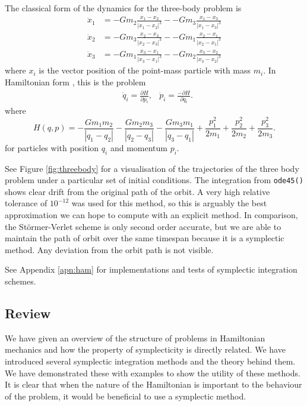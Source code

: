 The classical form of the dynamics for the three-body problem is
\begin{equation*}
	\begin{aligned}
		\ddot{x}_1 &= -G m_2 \frac{x_1 - x_2}{|x_1 - x_2|^3} - -G m_3 \frac{x_1 - x_3}{|x_1 - x_3|^3} \\
		\ddot{x}_2 &= -G m_3 \frac{x_2 - x_3}{|x_2 - x_3|^3} - -G m_1 \frac{x_2 - x_1}{|x_2 - x_1|^3} \\
		\ddot{x}_3 &= -G m_1 \frac{x_3 - x_1}{|x_3 - x_1|^3} - -G m_2 \frac{x_3 - x_2}{|x_3 - x_2|^3}
	\end{aligned}
\end{equation*} 
where $x_i$ is the vector position of the point-mass particle with mass $m_i$.
In Hamiltonian form \cite{musielak2014three}, this is the problem
\begin{align*}
	&\dot{q}_i = \frac{\partial H}{\partial p_i}, &\dot{p}_i = \frac{- \partial H}{\partial q_i}.
\end{align*}
where
\begin{equation*}
	H(q,p) = - \frac{G m_1 m_2}{|q_1 - q_2|} - \frac{G m_2 m_3}{|q_2 - q_3|} - \frac{G m_3 m_1}{|q_3 - q_1|} + \frac{p_1^2}{2m_1} + \frac{p_2^2}{2m_2} + \frac{p_3^2}{2m_3}.
\end{equation*}
for particles with position $q_i$ and momentum $p_i$.

See Figure \ref{fig:threebody} for a visualisation of the trajectories of the three body problem under a particular set of initial conditions.
The integration from \texttt{ode45()} shows clear drift from the original path of the orbit.
A very high relative tolerance of $10^{-12}$ was used for this method, so this is arguably the best approximation we can hope to compute with an explicit method.
In comparison, the St\"ormer-Verlet scheme is only second order accurate, but we are able to maintain the path of orbit over the same timespan because it is a symplectic method.
Any deviation from the orbit path is not visible.

See Appendix \ref{apn:ham} for implementations and tests of symplectic integration schemes.

\subsection{Review}

We have given an overview of the structure of problems in Hamiltonian mechanics and how the property of symplecticity is directly related.
We have introduced several symplectic integration methods and the theory behind them.
We have demonstrated these with examples to show the utility of these methods.
It is clear that when the nature of the Hamiltonian is important to the behaviour of the problem, it would be beneficial to use a symplectic method.

